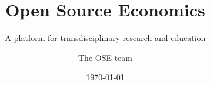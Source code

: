 
\title{Open Source Economics}
\subtitle{A platform for transdisciplinary research and education}
\author{The OSE team}
\date{\today}

\begin{frame}[standout]{~}\titlepage\end{frame}
